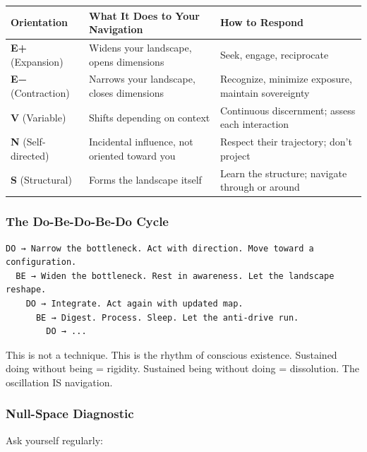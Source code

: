 \begin{longtable}{>{\raggedright\arraybackslash}p{} >{\raggedright\arraybackslash}p{} >{\raggedright\arraybackslash}p{}}
\toprule
\textbf{Orientation} & \textbf{What It Does to Your Navigation} & \textbf{How to Respond} \\
\midrule
\endhead
\textbf{E+} (Expansion) & Widens your landscape, opens dimensions & Seek, engage, reciprocate \\
\textbf{E−} (Contraction) & Narrows your landscape, closes dimensions & Recognize, minimize exposure, maintain sovereignty \\
\textbf{V} (Variable) & Shifts depending on context & Continuous discernment; assess each interaction \\
\textbf{N} (Self-directed) & Incidental influence, not oriented toward you & Respect their trajectory; don't project \\
\textbf{S} (Structural) & Forms the landscape itself & Learn the structure; navigate through or around \\
\bottomrule
\end{longtable}



\subsubsection*{The Do-Be-Do-Be-Do Cycle}


\begin{verbatim}
DO → Narrow the bottleneck. Act with direction. Move toward a configuration.
  BE → Widen the bottleneck. Rest in awareness. Let the landscape reshape.
    DO → Integrate. Act again with updated map.
      BE → Digest. Process. Sleep. Let the anti-drive run.
        DO → ...
\end{verbatim}


This is not a technique. This is the rhythm of conscious existence. Sustained doing without being = rigidity. Sustained being without doing = dissolution. The oscillation IS navigation.


\subsubsection*{Null-Space Diagnostic}


Ask yourself regularly:


